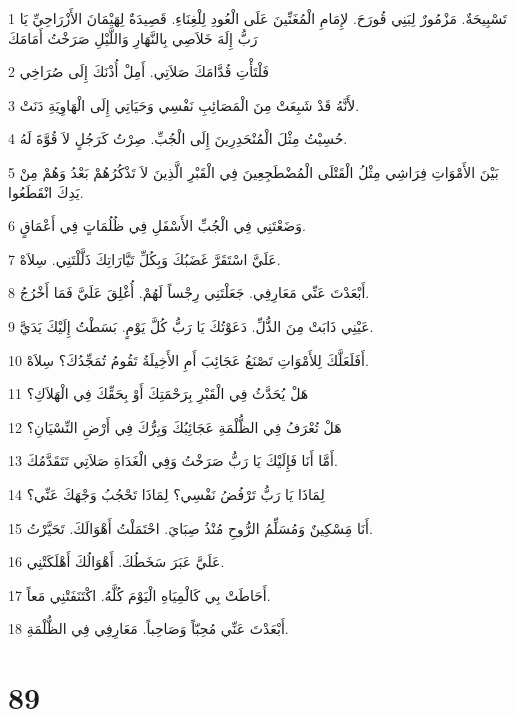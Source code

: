 \par 1 تَسْبِيحَةٌ. مَزْمُورٌ لِبَنِي قُورَحَ. لإِمَامِ الْمُغَنِّينَ عَلَى الْعُودِ لِلْغِنَاءِ. قَصِيدَةٌ لِهَيْمَانَ الأَزْرَاحِيِّ يَا رَبُّ إِلَهَ خَلاَصِي بِالنَّهَارِ وَاللَّيْلِ صَرَخْتُ أَمَامَكَ
\par 2 فَلْتَأْتِ قُدَّامَكَ صَلاَتِي. أَمِلْ أُذْنَكَ إِلَى صُرَاخِي
\par 3 لأَنَّهُ قَدْ شَبِعَتْ مِنَ الْمَصَائِبِ نَفْسِي وَحَيَاتِي إِلَى الْهَاوِيَةِ دَنَتْ.
\par 4 حُسِبْتُ مِثْلَ الْمُنْحَدِرِينَ إِلَى الْجُبِّ. صِرْتُ كَرَجُلٍ لاَ قُوَّةَ لَهُ.
\par 5 بَيْنَ الأَمْوَاتِ فِرَاشِي مِثْلُ الْقَتْلَى الْمُضْطَجِعِينَ فِي الْقَبْرِ الَّذِينَ لاَ تَذْكُرُهُمْ بَعْدُ وَهُمْ مِنْ يَدِكَ انْقَطَعُوا.
\par 6 وَضَعْتَنِي فِي الْجُبِّ الأَسْفَلِ فِي ظُلُمَاتٍ فِي أَعْمَاقٍ.
\par 7 عَلَيَّ اسْتَقَرَّ غَضَبُكَ وَبِكُلِّ تَيَّارَاتِكَ ذَلَّلْتَنِي. سِلاَهْ.
\par 8 أَبْعَدْتَ عَنِّي مَعَارِفِي. جَعَلْتَنِي رِجْساً لَهُمْ. أُغْلِقَ عَلَيَّ فَمَا أَخْرُجُ.
\par 9 عَيْنِي ذَابَتْ مِنَ الذُّلِّ. دَعَوْتُكَ يَا رَبُّ كُلَّ يَوْمٍ. بَسَطْتُ إِلَيْكَ يَدَيَّ.
\par 10 أَفَلَعَلَّكَ لِلأَمْوَاتِ تَصْنَعُ عَجَائِبَ أَمِ الأَخِيلَةُ تَقُومُ تُمَجِّدُكَ؟ سِلاَهْ.
\par 11 هَلْ يُحَدَّثُ فِي الْقَبْرِ بِرَحْمَتِكَ أَوْ بِحَقِّكَ فِي الْهَلاَكِ؟
\par 12 هَلْ تُعْرَفُ فِي الظُّلْمَةِ عَجَائِبُكَ وَبِرُّكَ فِي أَرْضِ النِّسْيَانِ؟
\par 13 أَمَّا أَنَا فَإِلَيْكَ يَا رَبُّ صَرَخْتُ وَفِي الْغَدَاةِ صَلاَتِي تَتَقَدَّمُكَ.
\par 14 لِمَاذَا يَا رَبُّ تَرْفُضُ نَفْسِي؟ لِمَاذَا تَحْجُبُ وَجْهَكَ عَنِّي؟
\par 15 أَنَا مَِسْكِينٌ وَمُسَلِّمُ الرُّوحِ مُنْذُ صِبَايَ. احْتَمَلْتُ أَهْوَالَكَ. تَحَيَّرْتُ.
\par 16 عَلَيَّ عَبَرَ سَخَطُكَ. أَهْوَالُكَ أَهْلَكَتْنِي.
\par 17 أَحَاطَتْ بِي كَالْمِيَاهِ الْيَوْمَ كُلَّهُ. اكْتَنَفَتْنِي مَعاً.
\par 18 أَبْعَدْتَ عَنِّي مُحِبّاً وَصَاحِباً. مَعَارِفِي فِي الظُّلْمَةِ.

\chapter{89}

